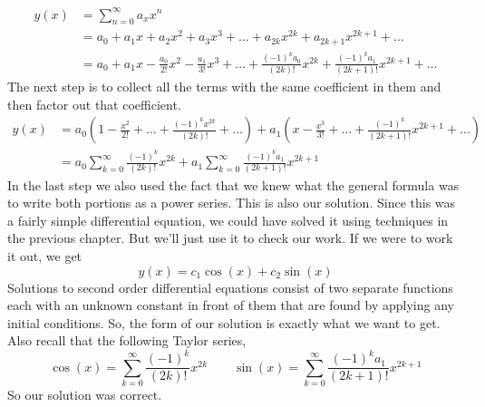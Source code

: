 \documentclass[10pt,reqno]{book}
\theoremstyle{definition}
\begin{document}
	\begin{align*}
	y(x) &= \sum_{n = 0}^{\infty} a_x x^n\\
	&= a_0 + a_1x + a_2x^2 + a_3x^3 + \ldots + a_{2k} x^{2k} + a_{2k+1} x^{2k+1} + \ldots\\
	&= a_0 + a_1x  - \frac{a_0}{2!}x^2 - \frac{a_1}{3!}x^3 + \dots + \frac{(-1)^k a_0}{(2k)!} x^{2k} + \frac{(-1)^k a_1}{(2k+1)!} x^{2k+1} + \ldots
	\end{align*}
	The next step is to collect all the terms with the same coefficient in them and then factor out that coefficient.
	\begin{align*}
	y(x) &= a_0 \left( 1 - \frac{x^2}{2!} + \ldots + \frac{(-1)^k x^{2k}}{(2k)!} + \ldots \right) + a_1 \left( x - \frac{x^3}{3!} + \ldots + \frac{(-1)^k}{(2k+1)!} x^{2k+1} + \dots \right)\\
	&= a_0 \sum_{k = 0}^{\infty}  \frac{(-1)^k}{(2k)!} x^{2k} + a_1 \sum_{k=0}^{\infty} \frac{(-1)^k a_1}{(2k+1)!} x^{2k+1}
	\end{align*}
	In the last step we also used the fact that we knew what the general formula was to write both portions as a power series. This is also our solution. Since this was a fairly simple differential equation, we could have solved it using techniques in the previous chapter. But we'll just use it to check our work. If we were to work it out, we get
	\[ y(x) = c_1 \cos(x) + c_2 \sin(x) \]
	Solutions to second order differential equations consist of two separate functions each with an unknown constant in front of them that are found by applying any initial conditions. So, the form of our solution is exactly what we want to get. Also recall that the following Taylor series,
	\[ \cos(x) = \sum_{k = 0}^{\infty}  \frac{(-1)^k}{(2k)!} x^{2k} \qquad \sin(x) = \sum_{k=0}^{\infty} \frac{(-1)^k a_1}{(2k+1)!} x^{2k+1}  \]
	So our solution was correct.
	
\end{document}
